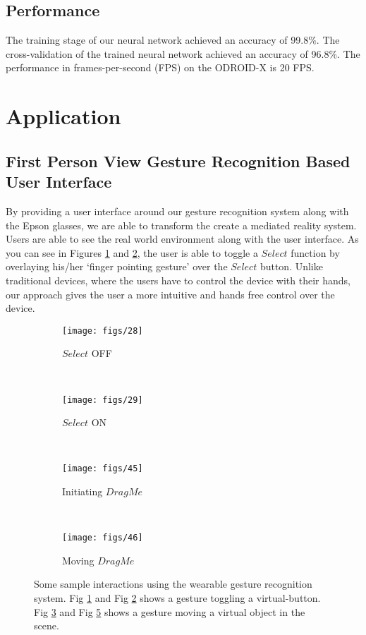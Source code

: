 \documentclass[conference]{IEEEtran}
\begin{document}
\subsection{Performance}
The training stage of our neural network achieved an accuracy of 99.8\%. The cross-validation of the trained neural network achieved an accuracy of 96.8\%. The performance in frames-per-second (FPS) on the ODROID-X is 20 FPS.

\section{Application}

\subsection{First Person View Gesture Recognition Based User Interface}
By providing a user interface around our gesture recognition system along with the Epson glasses, we are able to transform the create a mediated reality system. Users are able to see the real world environment along with the user interface. As you can see in Figures \ref{select_off} and \ref{select_on}, the user is able to toggle a $Select$ function by overlaying his/her `finger pointing gesture' over the $Select$ button.  Unlike traditional devices, where the users have to control the device with their hands, our approach gives the user a more intuitive and hands free control over the device.
\begin{figure}
    \centering
    \begin{subfigure}[b]{0.5\columnwidth}
        \centering
        \texttt{[image: figs/28]}
        \caption{$Select$ OFF}\label{select_off}
    \end{subfigure}~\begin{subfigure}[b]{0.5\columnwidth}
        \centering
        \texttt{[image: figs/29]}
        \caption{$Select$ ON}\label{select_on}
    \end{subfigure}
    \\
    \vspace{10pt}
    \begin{subfigure}[b]{0.5\columnwidth}
        \centering
        \texttt{[image: figs/45]}
        \caption{Initiating $Drag Me$}\label{drag_init}
    \end{subfigure}~\begin{subfigure}[b]{0.5\columnwidth}
        \centering
        \texttt{[image: figs/46]}
        \caption{Moving $Drag Me$}\label{drag_me}
    \end{subfigure}
    \caption{Some sample interactions using the wearable gesture recognition system. Fig \ref{select_off} and Fig \ref{select_on} shows a gesture toggling a virtual-button. Fig \ref{drag_init} and Fig \ref{drag_me} shows a gesture moving a virtual object in the scene.}
\end{figure}
\end{document}

